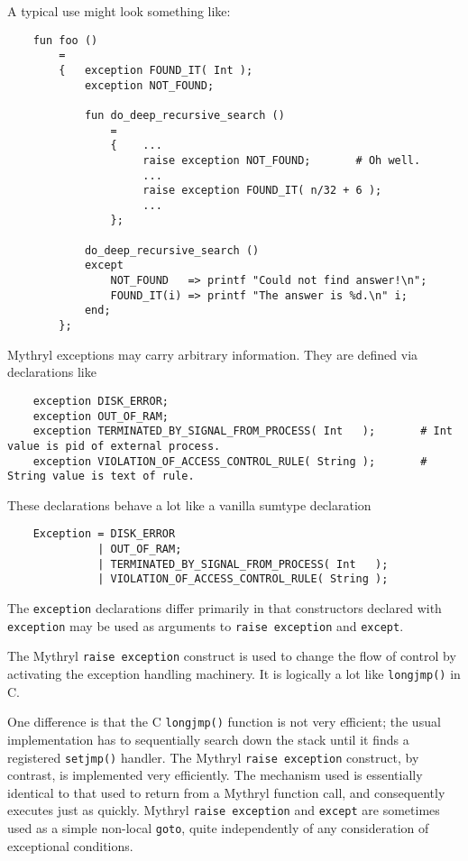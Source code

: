 A typical use might look something like:

\begin{verbatim}
    fun foo ()
        =
        {   exception FOUND_IT( Int );
            exception NOT_FOUND;

            fun do_deep_recursive_search ()
                =
                {    ...
                     raise exception NOT_FOUND;       # Oh well.
                     ...
                     raise exception FOUND_IT( n/32 + 6 );
                     ...
                };

            do_deep_recursive_search ()
            except
                NOT_FOUND   => printf "Could not find answer!\n";
                FOUND_IT(i) => printf "The answer is %d.\n" i;
            end;
        };
\end{verbatim}


Mythryl exceptions may carry arbitrary information.  They are 
defined via declarations like

\begin{verbatim}
    exception DISK_ERROR;
    exception OUT_OF_RAM;
    exception TERMINATED_BY_SIGNAL_FROM_PROCESS( Int   );       # Int value is pid of external process.
    exception VIOLATION_OF_ACCESS_CONTROL_RULE( String );       # String value is text of rule. 
\end{verbatim}

These declarations behave a lot like a vanilla 
sumtype declaration

\begin{verbatim}
    Exception = DISK_ERROR
              | OUT_OF_RAM;
              | TERMINATED_BY_SIGNAL_FROM_PROCESS( Int   );
              | VIOLATION_OF_ACCESS_CONTROL_RULE( String );
\end{verbatim}

The {\tt exception} declarations differ primarily in that 
constructors declared with {\tt exception} may be used as arguments to {\tt raise exception} and {\tt except}.

The Mythryl {\tt raise exception} construct is used to change the flow of control 
by activating the exception handling machinery. 
It is logically a lot like {\tt longjmp()} in C.

One difference is that the C {\tt longjmp()} function is not very 
efficient; the usual implementation has to sequentially search down 
the stack until it finds a registered {\tt setjmp()} handler. 
The Mythryl {\tt raise exception} construct, by contrast, is implemented very 
efficiently.  The mechanism used is essentially identical to that 
used to return from a Mythryl function call, and consequently 
executes just as quickly.  Mythryl {\tt raise exception} and {\tt except} 
are sometimes used as a simple non-local {\tt goto}, quite independently 
of any consideration of exceptional conditions.

